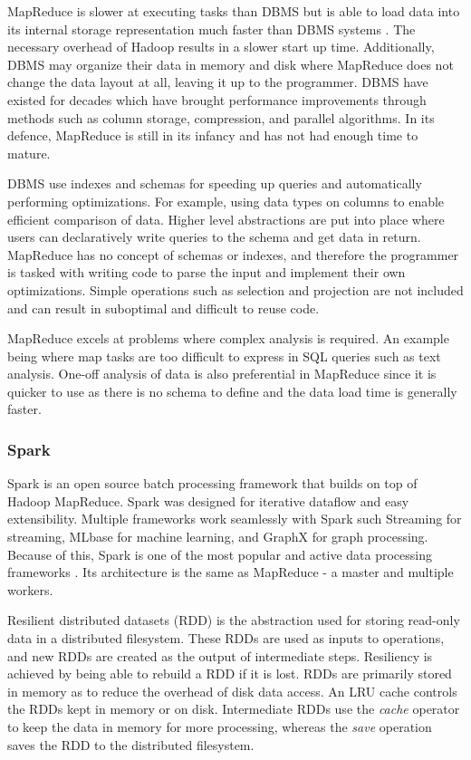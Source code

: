 \documentclass[12pt]{article}
\begin{document}
MapReduce is slower at executing tasks than DBMS but is able to load data into its internal storage representation much faster than DBMS systems \cite{pavlo2009mapreduce}. The necessary overhead of Hadoop results in a slower start up time. Additionally, DBMS may organize their data in memory and disk where MapReduce does not change the data layout at all, leaving it up to the programmer. DBMS have existed for decades which have brought performance improvements through methods such as column storage, compression, and parallel algorithms. In its defence, MapReduce is still in its infancy and has not had enough time to mature.

DBMS use indexes and schemas for speeding up queries and automatically performing optimizations. For example, using data types on columns to enable efficient comparison of data. Higher level abstractions are put into place where users can declaratively write queries to the schema and get data in return. MapReduce has no concept of schemas or indexes, and therefore the programmer is tasked with writing code to parse the input and implement their own optimizations. Simple operations such as selection and projection are not included and can result in suboptimal and difficult to reuse code.

MapReduce excels at problems where complex analysis is required. An example being where map tasks are too difficult to express in SQL queries such as text analysis. One-off analysis of data is also preferential in MapReduce since it is quicker to use as there is no schema to define and the data load time is generally faster.


\subsubsection{Spark} \label{ssub:spark}

Spark \cite{zaharia2010spark} is an open source batch processing framework that builds on top of Hadoop MapReduce. Spark was designed for iterative dataflow and easy extensibility. Multiple frameworks work seamlessly with Spark such Streaming for streaming, MLbase for machine learning, and GraphX for graph processing. Because of this, Spark is one of the most popular and active data processing frameworks \cite{zhang2016survey}. Its architecture is the same as MapReduce - a master and multiple workers.

Resilient distributed datasets (RDD) is the abstraction used for storing read-only data in a distributed filesystem. These RDDs are used as inputs to operations, and new RDDs are created as the output of intermediate steps. Resiliency is achieved by being able to rebuild a RDD if it is lost. RDDs are primarily stored in memory as to reduce the overhead of disk data access. An LRU cache controls the RDDs kept in memory or on disk. Intermediate RDDs use the \textit{cache} operator to keep the data in memory for more processing, whereas the \textit{save} operation saves the RDD to the distributed filesystem.
\end{document}
